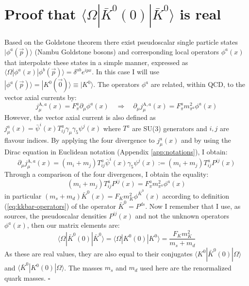 \documentclass[english, LaM, oneside, noexaminfo]{sapthesis}
\newcommand{\la}{\langle}
\newcommand{\ra}{\rangle}
\newcommand{\proved}{\newline \hspace*{.97\textwidth} $\square$}
\begin{document}
\section{Proof that $\la \Omega | \bar K^0 (0) | \bar K^0 \ra$ is real}\label{app:proof-reality}
\noindent
Based on the Goldstone theorem \cite{Goldstone-Theorem} there exist pseudoscalar single particle states $| \phi^a (\vec p) \ra$ (Nambu Goldstone bosons) and corresponding local operators $\phi^a(x)$ that interpolate these states in a simple manner, expressed as $\la\Omega | \phi^a (x) | \phi^b (\vec p) \ra = \delta^{ab}e^{ipx} $.
In this case I will use $|\phi^a(\vec p)\ra = | K^0 (\vec 0)\ra \equiv | K^0 \ra$.
The operators $\phi^a$ are related, within QCD, to the vector axial currents by:
\begin{equation*}
    j_\mu^{\text{A},a} (x) = F_\pi^a \partial_\mu \phi^a (x)
    \quad \Rightarrow \quad
    \partial_\mu j_\mu^{\text{A},a} (x) = F_\pi^a m_{\pi^a}^2 \phi^a (x)
\end{equation*}
However, the vector axial current is also defined as $j_\mu^a(x) = \bar \psi^i (x) T^a_{ij}\gamma_\mu \gamma_5 \psi^j (x)$ where $T^a$ are SU(3) generators and $i,j$ are flavour indices.
By applying the four divergence to $j_\mu^a(x)$ and by using the Dirac equation in Euclidean notation (Appendix \ref{app:notations}), I obtain:
\begin{equation*}
    \partial_\mu j_\mu^{\text{A},a} (x) = (m_i + m_j) T^a_{ij}\bar\psi^i (x) \gamma_5 \psi^j (x) := (m_i + m_j) T^a_{ij} P^{ij}(x)
\end{equation*}
Through a comparison of the four divergences, I obtain the equality:
\begin{equation*}
    (m_i + m_j) T^a_{ij} P^{ij}(x) = F_\pi^a m_{\pi^a}^2 \phi^a (x)
\end{equation*}
in particular $(m_s + m_d) \bar K^0(x) = F_K m_{K}^2 \phi^{\bar K^0} (x)$ according to definition (\ref{eq:kkbar-operators}) of the operator $\bar K^0 = P^{ds}$.
Now I remember that I use, as sources, the pseudoscalar densities $P^{ij}(x)$ and not the unknown operators $\phi^a (x)$, then our matrix elements are:
\begin{equation}\label{app:kaon-annihilation-amplitude}
    \la \Omega | \bar K^0 (0) |  \bar K^0 \ra = \la \Omega | K^0 (0) | K^0 \ra = \frac{F_K m_K^2}{m_s + m_d}
\end{equation}
As these are real values, they are also equal to their conjugates  $\la K^0  | \bar K^0 (0) |  \Omega\ra$ and $\la\bar K^0 | K^0 (0) | \Omega\ra$.
The masses $m_s$ and $m_d$ used here are the renormalized quark masses.
\proved
\end{document}
